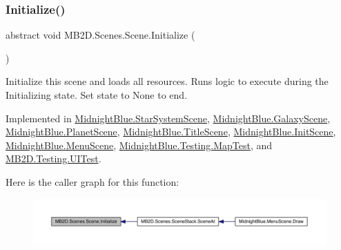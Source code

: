 \hypertarget{class_m_b2_d_1_1_scenes_1_1_scene_a081b4f8866936b495bdce388a7c96c25}{}\label{class_m_b2_d_1_1_scenes_1_1_scene_a081b4f8866936b495bdce388a7c96c25} 
\subsubsection{\texorpdfstring{Initialize()}{Initialize()}}
{\footnotesize\ttfamily abstract void M\+B2\+D.\+Scenes.\+Scene.\+Initialize (\begin{DoxyParamCaption}{ }\end{DoxyParamCaption})\hspace{0.3cm}{\ttfamily [pure virtual]}}



Initialize this scene and loads all resources. Runs logic to execute during the Initializing state. Set state to None to end. 



Implemented in \hyperlink{class_midnight_blue_1_1_star_system_scene_a1b593cd45d0f1b6c02f17ec5dd1033ca}{Midnight\+Blue.\+Star\+System\+Scene}, \hyperlink{class_midnight_blue_1_1_galaxy_scene_a97d97e56a73d9a4b7caf6dd6ce86647e}{Midnight\+Blue.\+Galaxy\+Scene}, \hyperlink{class_midnight_blue_1_1_planet_scene_ac8b7e88283b22b87aa45f116b549e86f}{Midnight\+Blue.\+Planet\+Scene}, \hyperlink{class_midnight_blue_1_1_title_scene_a793aa8253fba8d62a4ee19f042b22891}{Midnight\+Blue.\+Title\+Scene}, \hyperlink{class_midnight_blue_1_1_init_scene_a99eee8cc5dab8d7263591aeaa50144fb}{Midnight\+Blue.\+Init\+Scene}, \hyperlink{class_midnight_blue_1_1_menu_scene_ab46d90617acf2fad0a3c759337c54aaf}{Midnight\+Blue.\+Menu\+Scene}, \hyperlink{class_midnight_blue_1_1_testing_1_1_map_test_adcaa2f37efbf5764b48d297cabf17784}{Midnight\+Blue.\+Testing.\+Map\+Test}, and \hyperlink{class_m_b2_d_1_1_testing_1_1_u_i_test_af6f33faaa93d646edd5c74dfee6139d1}{M\+B2\+D.\+Testing.\+U\+I\+Test}.

Here is the caller graph for this function\+:
\nopagebreak
\begin{figure}[H]
\begin{center}
\leavevmode
\includegraphics[width=350pt]{class_m_b2_d_1_1_scenes_1_1_scene_a081b4f8866936b495bdce388a7c96c25_icgraph}
\end{center}
\end{figure}
\hypertarget{class_m_b2_d_1_1_scenes_1_1_scene_a0661eff0223150fa8e9ea88145409e5d}{}\label{class_m_b2_d_1_1_scenes_1_1_scene_a0661eff0223150fa8e9ea88145409e5d} 
